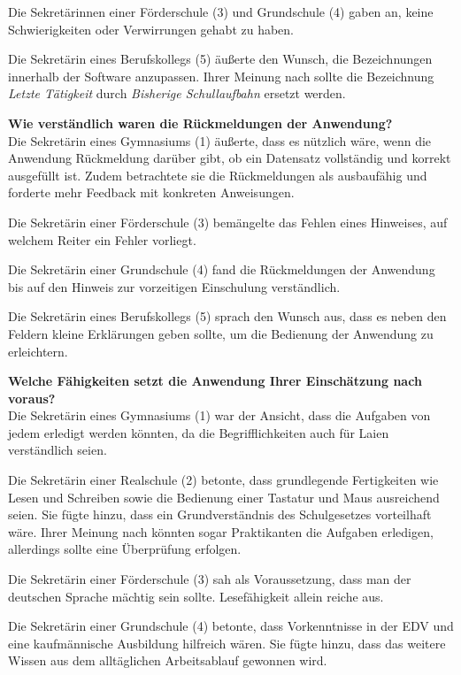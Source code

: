 Die Sekretärinnen einer Förderschule (3) und Grundschule (4) gaben an, keine Schwierigkeiten oder Verwirrungen gehabt zu haben.

Die Sekretärin eines Berufskollegs (5) äußerte den Wunsch, die Bezeichnungen innerhalb der Software anzupassen. Ihrer Meinung nach sollte die Bezeichnung \textit{Letzte Tätigkeit}  durch \textit{Bisherige Schullaufbahn}  ersetzt werden.

\textbf{Wie verständlich waren die Rückmeldungen der Anwendung?}\\
Die Sekretärin eines Gymnasiums (1) äußerte, dass es nützlich wäre, wenn die Anwendung Rückmeldung darüber gibt, ob ein Datensatz vollständig und korrekt ausgefüllt ist. Zudem betrachtete sie die Rückmeldungen als \glqq ausbaufähig\grqq{}  und forderte mehr Feedback mit konkreten Anweisungen.

Die Sekretärin einer Förderschule (3) bemängelte das Fehlen eines Hinweises, auf welchem Reiter ein Fehler vorliegt.

Die Sekretärin einer Grundschule (4) fand die Rückmeldungen der Anwendung bis auf den Hinweis zur \glqq vorzeitigen Einschulung\grqq{}  verständlich.

Die Sekretärin eines Berufskollegs (5) sprach den Wunsch aus, dass es neben den Feldern kleine Erklärungen geben sollte, um die Bedienung der Anwendung zu erleichtern.

\textbf{Welche Fähigkeiten setzt die Anwendung Ihrer Einschätzung nach voraus?}\\
Die Sekretärin eines Gymnasiums (1) war der Ansicht, dass die Aufgaben von jedem erledigt werden könnten, da die Begrifflichkeiten auch für Laien verständlich seien.

Die Sekretärin einer Realschule (2) betonte, dass grundlegende Fertigkeiten wie Lesen und Schreiben sowie die Bedienung einer Tastatur und Maus ausreichend seien. Sie fügte hinzu, dass ein Grundverständnis des Schulgesetzes vorteilhaft wäre. Ihrer Meinung nach könnten sogar Praktikanten die Aufgaben erledigen, allerdings sollte eine Überprüfung erfolgen.

Die Sekretärin einer Förderschule (3) sah als Voraussetzung, dass man der deutschen Sprache mächtig sein sollte. Lesefähigkeit allein reiche aus.

Die Sekretärin einer Grundschule (4) betonte, dass Vorkenntnisse in der EDV und eine kaufmännische Ausbildung hilfreich wären. Sie fügte hinzu, dass das weitere Wissen aus dem alltäglichen Arbeitsablauf gewonnen wird.

